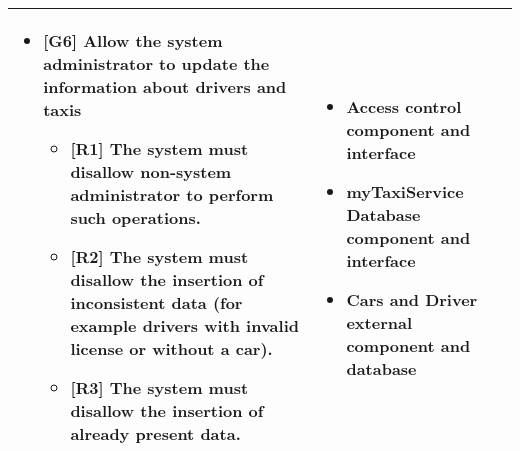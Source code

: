 \begin{center}
\begin{longtable}{|p{}|p{}|}
	\hline
	\MPtrue
	\begin{itemize}
	\item {[}G6{]} Allow the system administrator to update the information about drivers and taxis
	\begin{itemize}
		\item {[}R1{]} The system must disallow non-system administrator to perform such operations.
		\item {[}R2{]} The system must disallow the insertion of inconsistent data (for example drivers with invalid license or without a car).
		\item {[}R3{]} The system must disallow the insertion of already present data.
	\end{itemize}\end{itemize} &\MPtrue \begin{itemize}
	\item Access control component and interface
	\item myTaxiService Database component and interface
	\item Cars and Driver external component and database
\end{itemize}\\
\hline
\end{longtable}
\end{center}